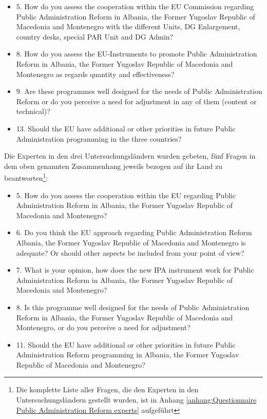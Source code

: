 \begin{itemize}
\item 5. How do you assess the cooperation within the EU Commission regarding Public Administration Reform in Albania, the Former Yugoslav Republic of Macedonia and Montenegro with the different Units, DG Enlargement, country desks, special PAR Unit and DG Admin?
\item 8. How do you assess the EU-Instruments to promote Public Administration Reform in Albania, the Former Yugoslav Republic of Macedonia and Montenegro as regards quantity and effectiveness?
\item 9. Are these programmes well designed for the needs of Public Administration Reform or do you perceive a need for adjustment in any of them (content or technical)?
\item 13. Should the EU have additional or other priorities in future Public Administration programming in the three countries?
\end{itemize}
Die Experten in den drei Untersuchungsländern wurden gebeten, fünf Fragen in dem oben genannten Zusammenhang jeweils bezogen auf ihr Land zu beantworten\footnote{Die komplette Liste aller Fragen, die den Experten in den Untersuchungsländern gestellt wurden, ist in Anhang \ref{anhang:Questionnaire Public Administration Reform experts} aufgeführt}:
\begin{itemize}
\item 5. How do you assess the cooperation within the EU regarding Public Administration Reform in Albania, the Former Yugoslav Republic of Macedonia and Montenegro?
\item 6. Do you think the EU approach regarding Public Administration Reform Albania, the Former Yugoslav Republic of Macedonia and Montenegro is adequate? Or should other aspects be included from your point of view?
\item 7. What is your opinion, how does the new IPA instrument work for Public Administration Reform in Albania, the Former Yugoslav Republic of Macedonia and Montenegro? 
\item 8. Is this programme well designed for the needs of Public Administration Reform in Albania, the Former Yugoslav Republic of Macedonia and Montenegro, or do you perceive a need for adjustment?
\item 11. Should the EU have additional or other priorities in future Public Administration Reform programming in Albania, the Former Yugoslav Republic of Macedonia and Montenegro?
\end{itemize}

